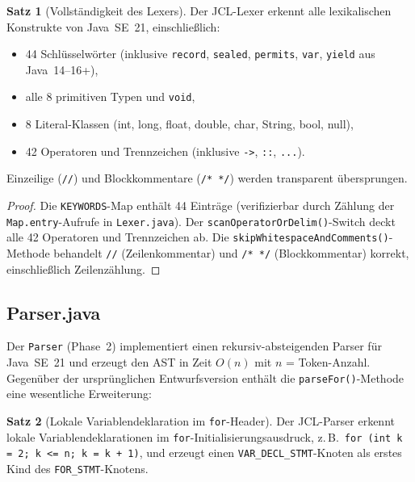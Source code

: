 ﻿\documentclass[a4paper,12pt]{article}
\theoremstyle{definition}
\newtheorem{satz}{Satz}
\begin{document}
\begin{satz}[Vollst\"andigkeit des Lexers]
\label{satz:lexer}
Der JCL-Lexer erkennt alle lexikalischen Konstrukte von Java~SE~21,
einschlie{\ss}lich:
\begin{itemize}
    \item 44 Schl\"usselw\"orter (inklusive \texttt{record},
          \texttt{sealed}, \texttt{permits}, \texttt{var},
          \texttt{yield} aus Java~14--16+),
    \item alle 8 primitiven Typen und \texttt{void},
    \item 8 Literal-Klassen (int, long, float, double, char,
          String, bool, null),
    \item 42 Operatoren und Trennzeichen (inklusive
          \texttt{->}, \texttt{::}, \texttt{...}).
\end{itemize}
Einzeilige (\texttt{//}) und Blockkommentare (\texttt{/* */})
werden transparent \"ubersprungen.
\end{satz}

\begin{proof}
Die \texttt{KEYWORDS}-Map enth\"alt 44 Eintr\"age (verifizierbar
durch Z\"ahlung der \texttt{Map.entry}-Aufrufe in
\texttt{Lexer.java}).  Der \texttt{scanOperatorOrDelim()}-Switch
deckt alle 42 Operatoren und Trennzeichen ab.
Die \texttt{skipWhitespaceAndComments()}-Methode behandelt
\texttt{//} (Zeilenkommentar) und \texttt{/* */}
(Blockkommentar) korrekt, einschlie{\ss}lich Zeilenz\"ahlung.
\end{proof}

\subsection{Parser.java}

Der \texttt{Parser} (Phase~2) implementiert einen
rekursiv-absteigenden Parser f\"ur Java~SE~21 und erzeugt den
AST in Zeit $O(n)$ mit $n$ = Token-Anzahl.  Gegen\"uber
der urspr\"unglichen Entwurfsversion enth\"alt die
\texttt{parseFor()}-Methode eine wesentliche Erweiterung:

\begin{satz}[Lokale Variablendeklaration im \texttt{for}-Header]
\label{satz:parser-for}
Der JCL-Parser erkennt lokale Variablendeklarationen im
\texttt{for}-Initialisierungsausdruck, z.\,B.\
\texttt{for (int k = 2; k <= n; k = k + 1)}, und erzeugt
einen \texttt{VAR\_DECL\_STMT}-Knoten als erstes Kind des
\texttt{FOR\_STMT}-Knotens.
\end{satz}
\end{document}
